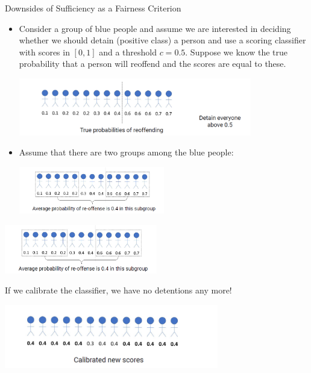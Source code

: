 \begin{vbframe}{Downsides of Sufficiency as a Fairness Criterion}
	\footnotesize{
		\begin{itemize}
			\item Consider a group of blue people and assume we are interested in deciding whether we should detain (positive class) a person and use a scoring classifier with scores in $[0,1]$ and a threshold $c=0.5.$ Suppose we know the true probability that a person will reoffend and the scores are equal to these.
%			
			\begin{center}
				\includegraphics[width=0.8\textwidth]{figure/calibration_issue_1.png}
			\end{center}  
			\item Assume that there are two groups among the blue people:
%			
			\begin{center}
				\includegraphics[width=0.5\textwidth]{figure/calibration_issue_2.png}
			\end{center}  
			
		\end{itemize}	
		\framebreak
		
		\begin{center}
			\includegraphics[width=0.5\textwidth]{figure/calibration_issue_2.png}
		\end{center}  
%		
		If we calibrate the classifier, we have no detentions any more!
%		
		\begin{center}
			\includegraphics[width=0.7\textwidth]{figure/calibration_issue_3.png}
		\end{center}	
	}
\end{vbframe}


